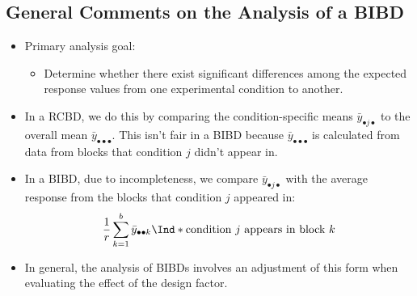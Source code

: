 \subsection*{General Comments on the Analysis of a BIBD}
\begin{itemize}
      \item Primary analysis goal:
            \begin{itemize}
                  \item Determine whether there exist significant differences among the expected response values from
                        one experimental condition to another.
            \end{itemize}
      \item In a RCBD, we do this by comparing the condition-specific means $ \bar{y}_{\bullet j\bullet} $ to the overall mean $ \bar{y}_{\bullet\bullet\bullet} $.
            This isn't fair in a BIBD because $ \bar{y}_{\bullet\bullet\bullet} $ is calculated from data from blocks that condition $ j $ didn't appear in.
      \item In a BIBD, due to incompleteness, we compare $ \bar{y}_{\bullet j\bullet} $ with the average response from the blocks that
            condition $j$ appeared in:
            \[ \frac{1}{r} \sum_{k=1}^{b} \bar{y}_{\bullet\bullet k}\Ind*{\text{condition $ j $ appears in block $ k $}} \]
      \item In general, the analysis of BIBDs involves an adjustment of this form when evaluating the effect of the
            design factor.
\end{itemize}

